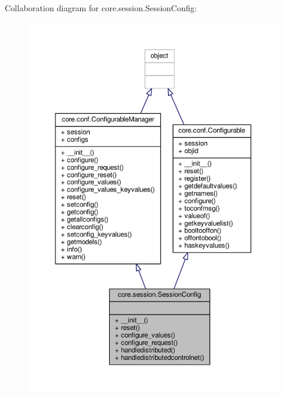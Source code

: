 Collaboration diagram for core.\+session.\+Session\+Config\+:
\nopagebreak
\begin{figure}[H]
\begin{center}
\leavevmode
\includegraphics[width=350pt]{classcore_1_1session_1_1_session_config__coll__graph}
\end{center}
\end{figure}
